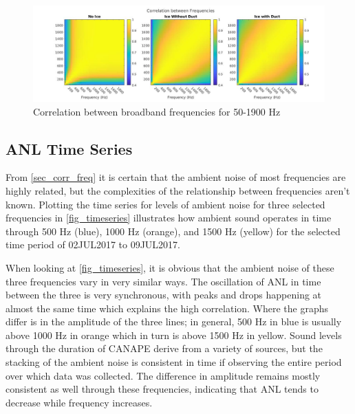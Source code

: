 
\begin{figure}[ht]
\centering
\includegraphics[scale=0.35]{Figures/corr_all_1x3.jpg}
\caption{Correlation between broadband frequencies for 50-1900 Hz}
\label{fig_freq_corr}
\end{figure}

\subsection{ANL Time Series}\label{sec_timeseries}

From \autoref{sec_corr_freq} it is certain that the ambient noise of most frequencies are highly related, but the complexities of the relationship between frequencies aren't known. Plotting the time series for levels of ambient noise for three selected frequencies in \autoref{fig_timeseries} illustrates how ambient sound operates in time through 500 Hz (blue), 1000 Hz (orange), and 1500 Hz (yellow) for the selected time period of 02JUL2017 to 09JUL2017. %

When looking at \autoref{fig_timeseries}, it is obvious that the ambient noise of these three frequencies vary in very similar ways. The oscillation of ANL in time between the three is very synchronous, with peaks and drops happening at almost the same time which explains the high correlation. Where the graphs differ is in the amplitude of the three lines; in general, 500 Hz in blue is usually above 1000 Hz in orange which in turn is above 1500 Hz in yellow. Sound levels through the duration of CANAPE derive from a variety of sources, but the stacking of the ambient noise is consistent in time if observing the entire period over which data was collected. The difference in amplitude remains mostly consistent as well through these frequencies, indicating that ANL tends to decrease while frequency increases. 

